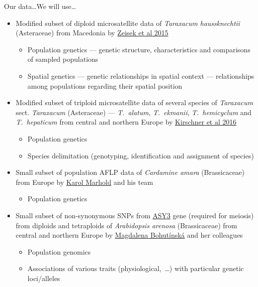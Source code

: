 \documentclass[compress, ucs, xelatex, 11pt, xcolor=svgnames, aspectratio=169,
	hyperref={
		bookmarks=true,
		unicode=true,
		colorlinks=true,
		pdftitle={Molecular data in R},
		plainpages=false,
		pdfauthor={Vojtech Zeisek},
		pdfsubject={Course about phylogeny and evolution in R},
		pdfcreator={XeLaTeX},
		pdfkeywords={R, evolution, phylogeny, molecular data},
		linkcolor=Crimson, %
		anchorcolor=Magenta, %
		citecolor=Magenta, %
		filecolor=Magenta, %
		menucolor=Magenta, %
		urlcolor=DodgerBlue, %
		pdftex},
	url={hyphens, lowtilde} %
	]{beamer}
\begin{document}
\begin{frame}[allowframebreaks]{Our data\ldots}{We will use\ldots}
		\begin{itemize}
			\item Modified subset of diploid microsatellite data of \textit{Taraxacum haussknechtii} (Asteraceae) from Macedonia by \href{https://trapa.cz/en/taraxacum-section-dioszegia}{Zeisek et al 2015}
			\begin{itemize}
				\item Population genetics --- genetic structure, characteristics and comparisons of sampled populations
				\item Spatial genetics --- genetic relationships in spatial context --- relationships among populations regarding their spatial position
			\end{itemize}
			\item Modified subset of triploid microsatellite data of several species of \textit{Taraxacum} sect. \textit{Taraxacum} (Asteraceae) --- \textit{T.~alatum}, \textit{T.~ekmanii}, \textit{T.~hemicyclum} and \textit{T.~hepaticum} from central and northern Europe by \href{https://trapa.cz/en/identif-oligoclonal-agamospermous-microsp}{Kirschner et al 2016}
			\begin{itemize}
				\item Population genetics
				\item Species delimitation (genotyping, identification and assignment of species)
			\end{itemize}
			\item Small subset of population AFLP data of \textit{Cardamine amara} (Brassicaceae) from Europe by \href{https://botany.natur.cuni.cz/brassiploidy/marhold}{Karol Marhold} and his team
			\begin{itemize}
				\item Population genetics
			\end{itemize}
			\item Small subset of non-synonymous SNPs from \href{https://www.arabidopsis.org/servlets/TairObject?type=locus&name=At2g46980}{ASY3} gene (required for meiosis) from diploids and tetraploids of \textit{Arabidopsis arenosa} (Brassicaceae) from central and northern Europe by \href{https://botany.natur.cuni.cz/ecolgen/people}{Magdalena Bohutínská} and her colleagues
			\begin{itemize}
				\item Population genomics
				\item Associations of various traits (physiological,~\ldots) with particular genetic loci/alleles

\end{itemize}
\end{itemize}
\end{frame}
\end{document}
